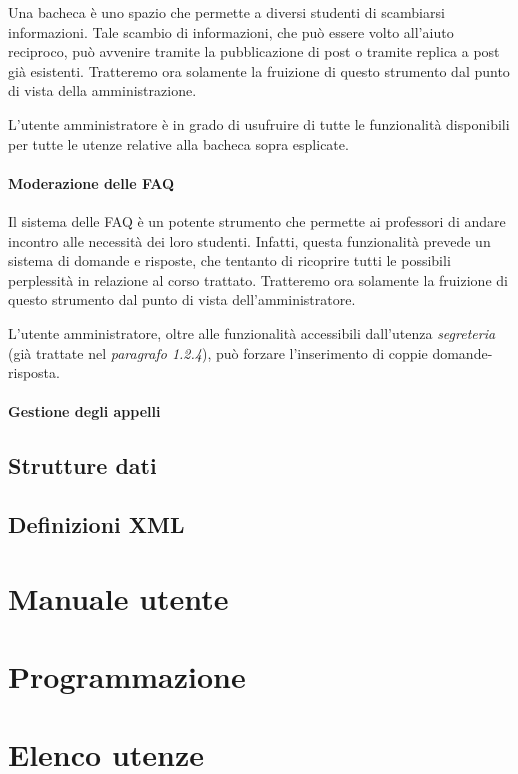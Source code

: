 \documentclass [a4paper,11pt]{book}
\begin{document}
Una bacheca è uno spazio che permette a diversi studenti di scambiarsi informazioni. Tale scambio di informazioni, che può essere volto all'aiuto reciproco, può avvenire tramite la pubblicazione di post o tramite replica a post già esistenti. Tratteremo ora solamente la fruizione di questo strumento dal punto di vista della amministrazione.

L'utente amministratore è in grado di usufruire di tutte le funzionalità disponibili per tutte le utenze relative alla bacheca sopra esplicate.

\medskip

\subsubsection{Moderazione delle FAQ}

Il sistema delle FAQ è un potente strumento che permette ai professori di andare incontro alle necessità dei loro studenti. Infatti, questa funzionalità prevede un sistema di domande e risposte, che tentanto di ricoprire tutti le possibili perplessità in relazione al corso trattato. Tratteremo ora solamente la fruizione di questo strumento dal punto di vista dell'amministratore.

L'utente amministratore, oltre alle funzionalità accessibili dall'utenza  \emph{segreteria} (già trattate nel \emph{paragrafo 1.2.4}), può forzare l'inserimento di coppie domande-risposta.

\medskip

\subsubsection{Gestione degli appelli}


\medskip

\section{Strutture dati}

\section{Definizioni XML}

\chapter{Manuale utente}

\chapter{Programmazione}

\chapter{Elenco utenze}
\end{document}
